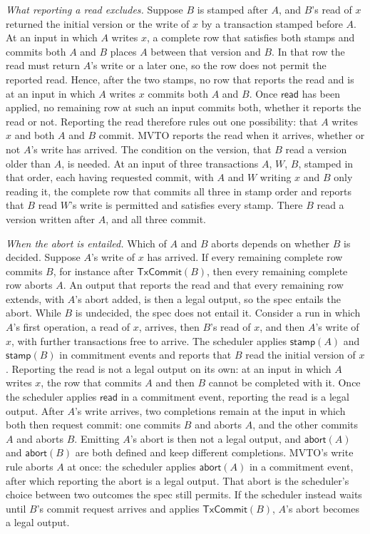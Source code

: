 \documentclass[sigconf]{cidr-2027}
\theoremstyle{remark}
\newcommand{\commitment}{commitment\xspace}
\newcommand{\outrel}{extends\xspace}          %
\begin{document}
\color{blue!70!black}\emph{What reporting a read excludes.}  Suppose $B$ is stamped after $A$, and
$B$'s read of $x$ returned the initial version or the write of $x$ by a
transaction stamped before $A$.  At an input in which $A$ writes $x$, a
complete row that satisfies both stamps and commits both $A$ and $B$ places $A$
between that version and $B$.  In that row the read must return $A$'s write
or a later one, so the row does not permit the reported read.  Hence, after the
two stamps, no row that reports the read and is at an input in which $A$
writes $x$ commits both $A$ and $B$.  Once $\mathsf{read}$ has been applied, no
remaining row at such an input commits both, whether it reports the read or
not.  Reporting the read therefore rules out one possibility: that $A$ writes
$x$ and both $A$ and $B$ commit.  MVTO reports the read when it arrives,
whether or not $A$'s write has arrived.  The condition on the version, that
$B$ read a version older than $A$, is needed.  At an input of three
transactions $A$, $W$, $B$, stamped in that order, each having requested
commit, with $A$ and $W$ writing $x$ and $B$ only reading it, the complete row
that commits all three in stamp order and reports that $B$ read $W$'s write is
permitted and satisfies every stamp.  There $B$ read a version written after
$A$, and all three commit.\color{black}

\color{blue!70!black}\emph{When the abort is entailed.}  Which of $A$ and $B$ aborts depends on
whether $B$ is decided.  Suppose $A$'s write of $x$ has arrived.  If every
remaining complete row commits $B$, for instance after $\mathsf{TxCommit}(B)$,
then every remaining complete row aborts $A$.  An output that reports the read
and that every remaining row \outrel, with $A$'s abort added, is then a legal
output, so the spec entails the abort.  While $B$ is undecided, the spec
does not entail it.  Consider a run in which $A$'s first operation, a read of $x$,
arrives, then $B$'s read of $x$, and then $A$'s write of $x$, with further
transactions free to arrive.  The scheduler applies $\mathsf{stamp}(A)$ and
$\mathsf{stamp}(B)$ in \commitment events and reports that $B$ read the initial
version of $x$.  Reporting the read is not a legal output on its own: at an
input in which $A$ writes $x$, the row that commits $A$ and then $B$ cannot be
completed with it.  Once the scheduler applies $\mathsf{read}$ in a
\commitment event, reporting the read is a legal output.  After $A$'s write
arrives, two completions remain at the input in which both then request
commit: one commits $B$ and aborts $A$, and the other commits $A$ and aborts
$B$.  Emitting $A$'s abort is then not a legal output, and $\mathsf{abort}(A)$ and
$\mathsf{abort}(B)$ are both defined and keep different completions.  MVTO's
write rule aborts $A$ at once: the scheduler applies $\mathsf{abort}(A)$ in a
\commitment event, after which reporting the abort is a legal output.  That abort is the scheduler's choice between two
outcomes the spec still permits.  If the scheduler instead waits until
$B$'s commit request arrives and applies $\mathsf{TxCommit}(B)$, $A$'s abort
becomes a legal output.\color{black}
\end{document}

